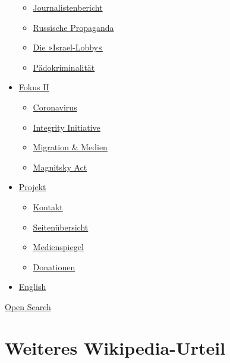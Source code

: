 \begin{itemize}
  \begin{itemize}
  \tightlist
  \item
    \href{https://swprs.org/bericht-eines-journalisten/}{Journalistenbericht}
  \item
    \href{https://swprs.org/russische-propaganda/}{Russische Propaganda}
  \item
    \href{https://swprs.org/die-israel-lobby-fakten-und-mythen/}{Die
    »Israel-Lobby«}
  \item
    \href{https://swprs.org/geopolitik-und-paedokriminalitaet/}{Pädokriminalität}
  \end{itemize}
\item
  \href{https://swprs.org/migration-und-medien/}{Fokus II}

  \begin{itemize}
  \tightlist
  \item
    \href{https://swprs.org/covid-19-hinweis-ii/}{Coronavirus}
  \item
    \href{https://swprs.org/die-integrity-initiative/}{Integrity
    Initiative}
  \item
    \href{https://swprs.org/migration-und-medien/}{Migration \& Medien}
  \item
    \href{https://swprs.org/der-fall-magnitsky/}{Magnitsky Act}
  \end{itemize}
\item
  \href{https://swprs.org/kontakt/}{Projekt}

  \begin{itemize}
  \tightlist
  \item
    \href{https://swprs.org/kontakt/}{Kontakt}
  \item
    \href{https://swprs.org/uebersicht/}{Seitenübersicht}
  \item
    \href{https://swprs.org/medienspiegel/}{Medienspiegel}
  \item
    \href{https://swprs.org/donationen/}{Donationen}
  \end{itemize}
\item
  \href{https://swprs.org/contact/}{English}
\end{itemize}

\protect\hyperlink{}{Open Search}

\hypertarget{weiteres-wikipedia-urteil}{%
\section{Weiteres Wikipedia-Urteil}\label{weiteres-wikipedia-urteil}}

